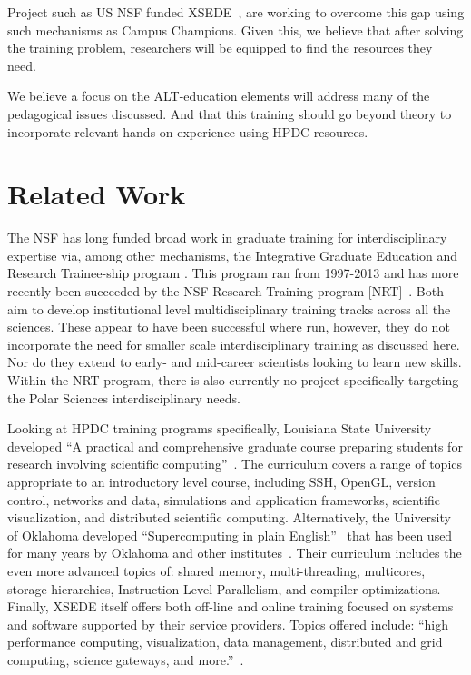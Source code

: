 \documentclass[conference]{IEEEtran}
\begin{document}
\begin{enumerate}[\setlength{\listparindent}{\parindent}]
Project such as US NSF funded XSEDE~\cite{noauthor_undated-lh}, are working to overcome this gap using such mechanisms as Campus Champions.  Given this, we believe that after solving the training problem, researchers will be equipped to find the resources they need. \end{enumerate} We believe a focus on the ALT-education elements will address many of the pedagogical issues discussed.  And that this training should go beyond theory to incorporate relevant hands-on experience using HPDC resources.

\section{Related Work}
The NSF has long funded broad work in graduate training for interdisciplinary expertise via, among other mechanisms, the Integrative Graduate Education and Research Trainee-ship program \cite{noauthor_undated-bu}.  This program ran from 1997-2013 and has more recently been succeeded by the NSF Research Training program [NRT]~\cite{NRT}.  Both aim to develop institutional level multidisciplinary training tracks across all the sciences. These appear to have been successful where run, however, they do not incorporate the need for smaller scale interdisciplinary training as discussed here.  Nor do they extend to early- and mid-career scientists looking to learn new skills. Within the NRT program, there is also currently no project specifically targeting the Polar Sciences interdisciplinary needs.

Looking at HPDC training programs specifically, Louisiana State University developed ``A practical and comprehensive graduate course preparing students for research involving scientific computing''~\cite{Allen2011-qx}. The curriculum covers a range of topics appropriate to an introductory level course, including SSH, OpenGL, version control, networks and data, simulations and application frameworks, scientific visualization, and distributed scientific computing. Alternatively, the University of Oklahoma  developed ``Supercomputing in plain English''~\cite{Neeman2002-dk} that has been used for many years by Oklahoma and other institutes~\cite{Neeman2008-mj}.  Their curriculum includes the even more advanced topics of: shared memory, multi-threading, multicores, storage hierarchies, Instruction Level Parallelism, and compiler optimizations.  Finally, XSEDE itself offers both off-line and online training focused on systems and software supported by their service providers. Topics offered include: ``high performance computing, visualization, data management, distributed and grid computing, science gateways, and more.''~\cite{noauthor_undated-ht}.  
\end{document}
